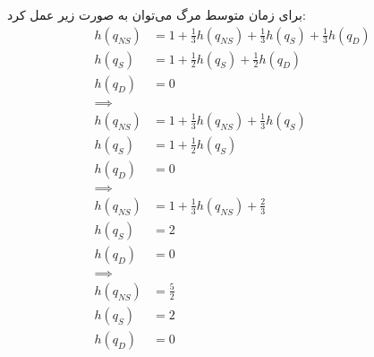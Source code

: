 برای زمان متوسط مرگ می‌توان به صورت زیر عمل کرد:
\begin{align*}
    h(q_{NS}) &= 1 + \frac{1}{3} h(q_{NS}) + \frac{1}{3} h(q_{S}) + \frac{1}{3} h(q_{D})\\
    h(q_{S}) &= 1 + \frac{1}{2} h(q_{S}) + \frac{1}{2} h(q_{D})\\
    h(q_{D}) &= 0\\
    \implies\\
    h(q_{NS}) &= 1 + \frac{1}{3} h(q_{NS}) + \frac{1}{3} h(q_{S})\\
    h(q_{S}) &= 1 + \frac{1}{2} h(q_{S})\\
    h(q_{D}) &= 0\\
    \implies\\
    h(q_{NS}) &= 1 + \frac{1}{3} h(q_{NS}) + \frac{2}{3}\\
    h(q_{S}) &= 2\\
    h(q_{D}) &= 0\\
    \implies\\
    h(q_{NS}) &= \frac{5}{2}\\
    h(q_{S}) &= 2\\
    h(q_{D}) &= 0
\end{align*}


